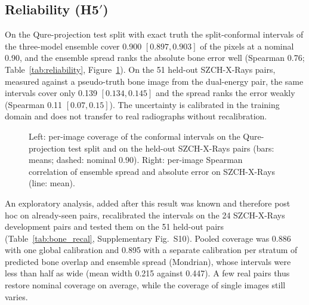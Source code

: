 \subsection{Reliability (\texorpdfstring{H5$'$}{H5'})}
On the Qure-projection test split with exact truth the split-conformal intervals of the three-model ensemble cover 0.900 $[0.897,0.903]$ of
the pixels at a nominal 0.90, and the ensemble spread ranks the absolute bone error well (Spearman 0.76; Table~\ref{tab:reliability},
Figure~\ref{fig:reliability}). On the 51 held-out SZCH-X-Rays pairs, measured against a pseudo-truth bone image from the dual-energy pair, the
same intervals cover only 0.139 $[0.134,0.145]$ and the spread ranks the error weakly (Spearman 0.11 $[0.07,0.15]$). The uncertainty is
calibrated in the training domain and does not transfer to real radiographs without recalibration.
\begin{table}[htbp]
\centering\small
\caption{Ensemble spread and split-conformal intervals ($K=3$, nominal coverage 0.90), with image-bootstrap intervals.}
\label{tab:reliability}
\end{table}
\begin{figure}[htbp]
\centering
{}
\caption{Left: per-image coverage of the conformal intervals on the Qure-projection test split and on the held-out SZCH-X-Rays pairs (bars:
means; dashed: nominal 0.90). Right: per-image Spearman correlation of ensemble spread and absolute error on SZCH-X-Rays (line: mean).}
\label{fig:reliability}
\end{figure}

An exploratory analysis, added after this result was known and therefore post hoc on already-seen pairs, recalibrated the intervals on the
24 SZCH-X-Rays development pairs and tested them on the 51 held-out pairs (Table~\ref{tab:bone_recal}, Supplementary Fig.~S10). Pooled
coverage was 0.886 with one global calibration and 0.895 with a separate calibration per stratum of predicted bone overlap and ensemble spread
(Mondrian), whose intervals were less than half as wide (mean width 0.215 against 0.447). A few real pairs thus restore nominal coverage on
average, while the coverage of single images still varies.
\begin{table}[htbp]
\centering\small
\caption{Exploratory recalibration on real pairs (post hoc): bone-image intervals calibrated on the 24 SZCH-X-Rays development pairs and tested
on the 51 held-out pairs at nominal 0.90. Mondrian: calibration per stratum of predicted bone overlap and ensemble spread.}
\label{tab:bone_recal}
\end{table}
